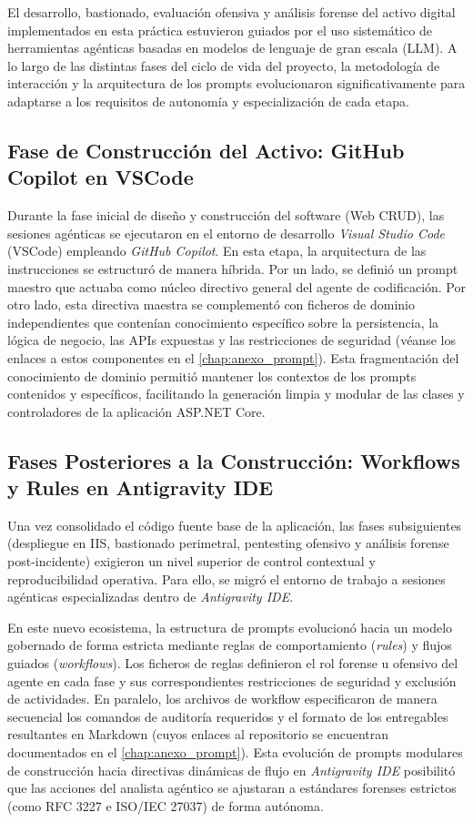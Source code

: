 El desarrollo, bastionado, evaluación ofensiva y análisis forense del activo digital implementados en esta práctica estuvieron guiados por el uso sistemático de herramientas agénticas basadas en modelos de lenguaje de gran escala (LLM). A lo largo de las distintas fases del ciclo de vida del proyecto, la metodología de interacción y la arquitectura de los prompts evolucionaron significativamente para adaptarse a los requisitos de autonomía y especialización de cada etapa.

\subsection*{Fase de Construcción del Activo: GitHub Copilot en VSCode}
Durante la fase inicial de diseño y construcción del software (Web CRUD), las sesiones agénticas se ejecutaron en el entorno de desarrollo \textit{Visual Studio Code} (VSCode) empleando \textit{GitHub Copilot}. En esta etapa, la arquitectura de las instrucciones se estructuró de manera híbrida. Por un lado, se definió un prompt maestro que actuaba como núcleo directivo general del agente de codificación. Por otro lado, esta directiva maestra se complementó con ficheros de dominio independientes que contenían conocimiento específico sobre la persistencia, la lógica de negocio, las APIs expuestas y las restricciones de seguridad (véanse los enlaces a estos componentes en el \ref{chap:anexo_prompt}). Esta fragmentación del conocimiento de dominio permitió mantener los contextos de los prompts contenidos y específicos, facilitando la generación limpia y modular de las clases y controladores de la aplicación ASP.NET Core.

\subsection*{Fases Posteriores a la Construcción: Workflows y Rules en Antigravity IDE}
Una vez consolidado el código fuente base de la aplicación, las fases subsiguientes (despliegue en IIS, bastionado perimetral, pentesting ofensivo y análisis forense post-incidente) exigieron un nivel superior de control contextual y reproducibilidad operativa. Para ello, se migró el entorno de trabajo a sesiones agénticas especializadas dentro de \textit{Antigravity IDE}.

En este nuevo ecosistema, la estructura de prompts evolucionó hacia un modelo gobernado de forma estricta mediante reglas de comportamiento (\textit{rules}) y flujos guiados (\textit{workflows}). Los ficheros de reglas definieron el rol forense u ofensivo del agente en cada fase y sus correspondientes restricciones de seguridad y exclusión de actividades. En paralelo, los archivos de workflow especificaron de manera secuencial los comandos de auditoría requeridos y el formato de los entregables resultantes en Markdown (cuyos enlaces al repositorio se encuentran documentados en el \ref{chap:anexo_prompt}). Esta evolución de prompts modulares de construcción hacia directivas dinámicas de flujo en \textit{Antigravity IDE} posibilitó que las acciones del analista agéntico se ajustaran a estándares forenses estrictos (como RFC 3227 e ISO/IEC 27037) de forma autónoma.

